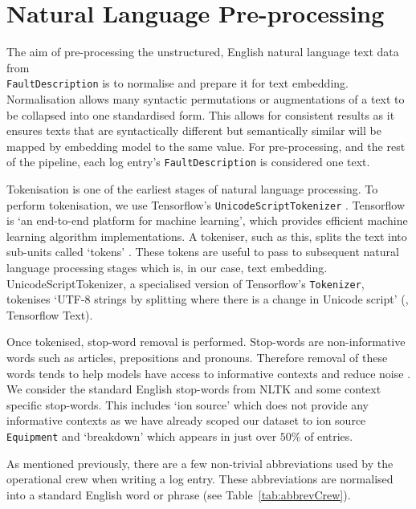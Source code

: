\documentclass[10pt,oneside]{report}
\begin{document}

\section{Natural Language Pre-processing}

The aim of pre-processing the unstructured, English natural language text data from \\ \texttt{FaultDescription} is to normalise and prepare it for text embedding. Normalisation allows many syntactic permutations or augmentations of a text to be collapsed into one standardised form. This allows for consistent results as it ensures texts that are syntactically different but semantically similar will be mapped by embedding model to the same value. For pre-processing, and the rest of the pipeline, each log entry's \texttt{FaultDescription} is considered one text.


Tokenisation is one of the earliest stages of natural language processing. To perform tokenisation, we use Tensorflow's \texttt{UnicodeScriptTokenizer} \cite{tensorflow2015whitepaper}. Tensorflow is `an end-to-end platform for machine learning', which provides efficient machine learning algorithm implementations. A tokeniser, such as this, splits the text into sub-units called `tokens' \cite{gefenstette1999tokenization}. These tokens are useful to pass to subsequent natural language processing stages which is, in our case, text embedding. UnicodeScriptTokenizer, a specialised version of Tensorflow's \texttt{Tokenizer}, tokenises `UTF-8 strings by splitting where there is a change in Unicode script' (\cite{tensorflow2015whitepaper}, Tensorflow Text). 

Once tokenised, stop-word removal is performed. Stop-words are non-informative words such as articles, prepositions and pronouns. Therefore removal of these words tends to help models have access to informative contexts and reduce noise \cite{silva2003importance}. We consider the standard English stop-words from NLTK \cite{bird2009natural} and some context specific stop-words. This includes `ion source' which does not provide any informative contexts as we have already scoped our dataset to ion source \texttt{Equipment} and `breakdown' which appears in just over $50\%$ of entries. 

As mentioned previously, there are a few non-trivial abbreviations used by the operational crew when writing a log entry. These abbreviations are normalised into a standard English word or phrase (see Table~\ref{tab:abbrevCrew}).
\end{document}

